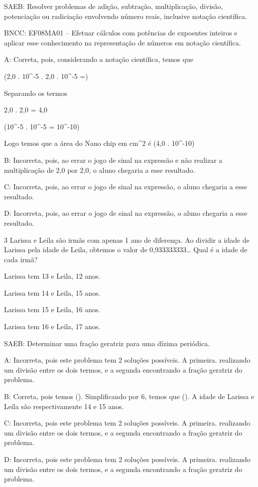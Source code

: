 {SAEB: Resolver problemas de adição, subtração, multiplicação, divisão,
potenciação ou radiciação envolvendo número reais, inclusive notação
científica.

BNCC: EF08MA01 -- Efetuar cálculos com potências de expoentes inteiros e
aplicar esse conhecimento na representação de números em notação
científica.

A: Correta, pois, considerando a notação científica, temos que

(2,0 . 10^{-5} . 2,0 . 10^{-5} =)

Separando os termos

2,0 . 2,0 = 4,0

(10^{-5} . 10^{-5} = 10^{-10})

Logo temos que a área do Nano chip em cm^2 é (4,0 . 10^{-10})

B: Incorreta, pois, ao errar o jogo de sinal na expressão e não realizar
a multiplicação de 2,0 por 2,0, o aluno chegaria a esse resultado.

C: Incorreta, pois, ao errar o jogo de sinal na expressão, o aluno
chegaria a esse resultado.

D: Incorreta, pois, ao errar o jogo de sinal na expressão, o aluno
chegaria a esse resultado.

\num{3} Larissa e Leila são irmãs com apenas 1 ano de diferença. Ao dividir a
idade de Larissa pela idade de Leila, obtemos o valor de
0,933333333\ldots{} Qual é a idade de cada irmã?
\item Larissa tem 13 e Leila, 12 anos.
\item Larissa tem 14 e Leila, 15 anos.
\item Larissa tem 15 e Leila, 16 anos.
\item Larissa tem 16 e Leila, 17 anos.

SAEB: Determinar uma fração geratriz para uma dízima periódica.

A: Incorreta, pois este problema tem 2 soluções possíveis. A primeira.
realizando um divisão entre os dois termos, e a segunda encontrando a
fração geratriz do problema.

B: Correta, pois temos (). Simplificando por 6, temos que
(). A idade de Larissa e Leila são respectivamente 14 e
15 anos.

C: Incorreta, pois este problema tem 2 soluções possíveis. A primeira.
realizando um divisão entre os dois termos, e a segunda encontrando a
fração geratriz do problema.

D: Incorreta, pois este problema tem 2 soluções possíveis. A primeira.
realizando um divisão entre os dois termos, e a segunda encontrando a
fração geratriz do problema.

}
